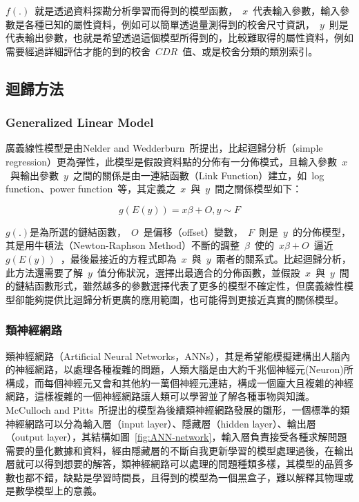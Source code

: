 $f(.)$~就是透過資料探勘分析學習而得到的模型函數，~$x$~代表輸入參數，輸入參數是各種已知的屬性資料，例如可以簡單透過量測得到的校舍尺寸資訊，~$y$~則是代表輸出參數，也就是希望透過這個模型所得到的，比較難取得的屬性資料，例如需要經過詳細評估才能的到的校舍~$CDR$~值、或是校舍分類的類別索引。

\subsection{迴歸方法}

\subsubsection{Generalized Linear Model}

廣義線性模型是由Nelder and Wedderburn~\cite{citeulike:5485398}所提出，比起迴歸分析（simple regression）更為彈性，此模型是假設資料點的分佈有一分佈模式，且輸入參數~$x$~與輸出參數~$y$~之間的關係是由一連結函數（Link Function）建立，如~log function、power function~等，其定義之~$x$~與~$y$~間之關係模型如下：


\begin{equation} g(E(y)) = x\beta + O, y \sim F \label{eq:GLM}\end{equation} 

$g(.)$是為所選的鏈結函數，~$O$~是偏移（offset）變數，~$F$~則是~$y$~的分佈模型，其是用牛頓法（Newton-Raphson Method）不斷的調整~$\beta$~使的~$x\beta + O$~逼近~$g(E(y))$~，最後最接近的方程式即為~$x$~與~$y$~兩者的關系式。比起迴歸分析，此方法還需要了解~$y$~值分佈狀況，選擇出最適合的分佈函數，並假設~$x$~與~$y$~間的鏈結函數形式，雖然越多的參數選擇代表了更多的模型不確定性，但廣義線性模型卻能夠提供比迴歸分析更廣的應用範圍，也可能得到更接近真實的關係模型。


\subsubsection{類神經網路}

類神經網路（Artificial Neural Networks，ANNs），其是希望能模擬建構出人腦內的神經網路，以處理各種複雜的問題，人類大腦是由大約千兆個神經元(Neuron)所構成，而每個神經元又會和其他約一萬個神經元連結，構成一個龐大且複雜的神經網路，這樣複雜的一個神經網路讓人類可以學習並了解各種事物與知識。McCulloch and Pitts~\cite{mcculloch1943logical}所提出的模型為後續類神經網路發展的雛形，一個標準的類神經網路可以分為輸入層（input layer）、隱藏層（hidden layer）、輸出層（output layer），其結構如圖~\ref{fig:ANN-network}，輸入層負責接受各種求解問題需要的量化數據和資料，經由隱藏層的不斷自我更新學習的模型處理過後，在輸出層就可以得到想要的解答，類神經網路可以處理的問題種類多樣，其模型的品質多數也都不錯，缺點是學習時間長，且得到的模型為一個黑盒子，難以解釋其物理或是數學模型上的意義。

